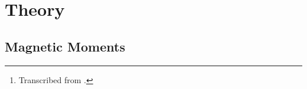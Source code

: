 \maketitle%

\begin{abstract}
\noindent
In this experiment, the barrier to rotation in  can be determined by measuring changes in \NMR* line shapes as a function of temperature. This study is an example of dynamic NMR spectroscopy (spectroscopy on a changing system, as opposed to a static one).\thanks{Transcribed from \textcite{nibler14,gasparro77}.}
\end{abstract}


\section{Theory} %
\label{sec:theory}

\subsection{Magnetic Moments} %
\label{sub:magnetic_moments}

